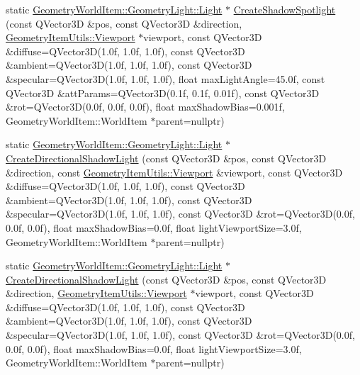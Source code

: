 \begin{DoxyCompactItemize}
\item 
static \mbox{\hyperlink{class_geometry_engine_1_1_geometry_world_item_1_1_geometry_light_1_1_light}{Geometry\+World\+Item\+::\+Geometry\+Light\+::\+Light}} $\ast$ \mbox{\hyperlink{class_geometry_engine_1_1_geometry_factory_a11eb3aa78243fffeeb9673d73a37c73e}{Create\+Shadow\+Spotlight}} (const Q\+Vector3D \&pos, const Q\+Vector3D \&direction, \mbox{\hyperlink{class_geometry_engine_1_1_geometry_item_utils_1_1_viewport}{Geometry\+Item\+Utils\+::\+Viewport}} $\ast$viewport, const Q\+Vector3D \&diffuse=Q\+Vector3D(1.\+0f, 1.\+0f, 1.\+0f), const Q\+Vector3\+D \&ambient=\+Q\+Vector3\+D(1.\+0f, 1.\+0f, 1.\+0f), const Q\+Vector3\+D \&specular=\+Q\+Vector3\+D(1.\+0f, 1.\+0f, 1.\+0f), float max\+Light\+Angle=45.\+0f, const Q\+Vector3\+D \&att\+Params=\+Q\+Vector3\+D(0.\+1f, 0.\+1f, 0.\+01f), const Q\+Vector3\+D \&rot=\+Q\+Vector3\+D(0.\+0f, 0.\+0f, 0.\+0f), float max\+Shadow\+Bias=0.\+001f, Geometry\+World\+Item\+::\+World\+Item $\ast$parent=nullptr)
\item 
static \mbox{\hyperlink{class_geometry_engine_1_1_geometry_world_item_1_1_geometry_light_1_1_light}{Geometry\+World\+Item\+::\+Geometry\+Light\+::\+Light}} $\ast$ \mbox{\hyperlink{class_geometry_engine_1_1_geometry_factory_ae663bbb598b21a847eae1b62a7547580}{Create\+Directional\+Shadow\+Light}} (const Q\+Vector3D \&pos, const Q\+Vector3D \&direction, const \mbox{\hyperlink{class_geometry_engine_1_1_geometry_item_utils_1_1_viewport}{Geometry\+Item\+Utils\+::\+Viewport}} \&viewport, const Q\+Vector3D \&diffuse=Q\+Vector3D(1.\+0f, 1.\+0f, 1.\+0f), const Q\+Vector3\+D \&ambient=\+Q\+Vector3\+D(1.\+0f, 1.\+0f, 1.\+0f), const Q\+Vector3\+D \&specular=\+Q\+Vector3\+D(1.\+0f, 1.\+0f, 1.\+0f), const Q\+Vector3\+D \&rot=\+Q\+Vector3\+D(0.\+0f, 0.\+0f, 0.\+0f), float max\+Shadow\+Bias=0.\+0f, float light\+Viewport\+Size=3.\+0f, Geometry\+World\+Item\+::\+World\+Item $\ast$parent=nullptr)
\item 
static \mbox{\hyperlink{class_geometry_engine_1_1_geometry_world_item_1_1_geometry_light_1_1_light}{Geometry\+World\+Item\+::\+Geometry\+Light\+::\+Light}} $\ast$ \mbox{\hyperlink{class_geometry_engine_1_1_geometry_factory_ab14ce0c00c6353be91a511572c89ae30}{Create\+Directional\+Shadow\+Light}} (const Q\+Vector3D \&pos, const Q\+Vector3D \&direction, \mbox{\hyperlink{class_geometry_engine_1_1_geometry_item_utils_1_1_viewport}{Geometry\+Item\+Utils\+::\+Viewport}} $\ast$viewport, const Q\+Vector3D \&diffuse=Q\+Vector3D(1.\+0f, 1.\+0f, 1.\+0f), const Q\+Vector3\+D \&ambient=\+Q\+Vector3\+D(1.\+0f, 1.\+0f, 1.\+0f), const Q\+Vector3\+D \&specular=\+Q\+Vector3\+D(1.\+0f, 1.\+0f, 1.\+0f), const Q\+Vector3\+D \&rot=\+Q\+Vector3\+D(0.\+0f, 0.\+0f, 0.\+0f), float max\+Shadow\+Bias=0.\+0f, float light\+Viewport\+Size=3.\+0f, Geometry\+World\+Item\+::\+World\+Item $\ast$parent=nullptr)

\end{DoxyCompactItemize}

